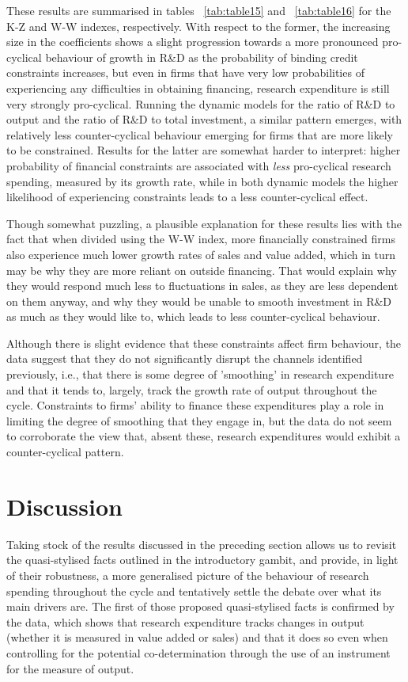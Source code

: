 \documentclass{_latex/house}
\begin{document}
These results are summarised in tables ~\ref{tab:table15} and ~\ref{tab:table16} for the K-Z and W-W indexes, respectively. With respect to the former, the increasing size in the coefficients shows a slight progression towards a more pronounced pro-cyclical behaviour of growth in R\&D as the probability of binding credit constraints increases, but even in firms that have very low probabilities of experiencing any difficulties in obtaining financing, research expenditure is still very strongly pro-cyclical. Running the dynamic models for the ratio of R\&D to output and the ratio of R\&D to total investment, a similar pattern emerges, with relatively less counter-cyclical behaviour emerging for firms that are more likely to be constrained. Results for the latter are somewhat harder to interpret: higher probability of financial constraints are associated with \textit{less} pro-cyclical research spending, measured by its growth rate, while in both dynamic models the higher likelihood of experiencing constraints leads to a less counter-cyclical effect.

Though somewhat puzzling, a plausible explanation for these results lies with the fact that when divided using the W-W index, more financially constrained firms also experience much lower growth rates of sales and value added, which in turn may be why they are more reliant on outside financing. That would explain why they would respond much less to fluctuations in sales, as they are less dependent on them anyway, and why they would be unable to smooth investment in R\&D as much as they would like to, which leads to less counter-cyclical behaviour.

Although there is slight evidence that these constraints affect firm behaviour, the data suggest that they do not significantly disrupt the channels identified previously, i.e., that there is some degree of 'smoothing' in research expenditure and that it tends to, largely, track the growth rate of output throughout the cycle. Constraints to firms' ability to finance these expenditures play a role in limiting the degree of smoothing that they engage in, but the data do not seem to corroborate the view that, absent these, research expenditures would exhibit a counter-cyclical pattern.
\section{Discussion} \label{discussion}
Taking stock of the results discussed in the preceding section allows us to revisit the quasi-stylised facts outlined in the introductory gambit, and provide, in light of their robustness, a more generalised picture of the behaviour of research spending throughout the cycle and tentatively settle the debate over what its main drivers are. The first of those proposed quasi-stylised facts is confirmed by the data, which shows that research expenditure tracks changes in output (whether it is measured in value added or sales) and that it does so even when controlling for the potential co-determination through the use of an instrument for the measure of output.
\end{document}
